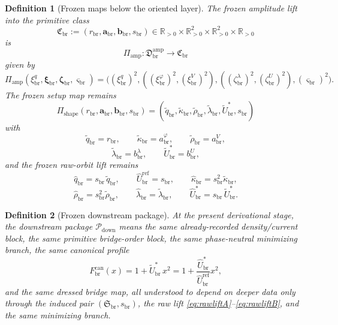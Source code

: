 \documentclass[11pt]{article}
\newcommand{\RespShapeReadout}{\widetilde q_{\mathrm{br}}}
\newcommand{\RespShapeCov}{\widetilde\kappa_{\mathrm{br}}}
\newcommand{\RespShapeRelax}{\widetilde\rho_{\mathrm{br}}}
\newcommand{\RespShapeWell}{\widetilde\lambda_{\mathrm{br}}}
\newcommand{\RespShapeEq}{\widetilde U_{\mathrm{br}}^{\ast}}
\newcommand{\RespRawReadout}{\widehat q_{\mathrm{br}}}
\newcommand{\RespRawRef}{\widehat U_{\mathrm{br}}^{\mathrm{ref}}}
\newcommand{\RespRawCov}{\widehat\kappa_{\mathrm{br}}}
\newcommand{\RespRawRelax}{\widehat\rho_{\mathrm{br}}}
\newcommand{\RespRawWell}{\widehat\lambda_{\mathrm{br}}}
\newcommand{\RespRawEq}{\widehat U_{\mathrm{br}}^{\ast}}
\newcommand{\CurvProfileCan}{F_{\mathrm{br}}^{\mathrm{can}}}
\newcommand{\DownPkg}{\mathscr P_{\mathrm{down}}}
\newcommand{\ShapeTuple}{\mathfrak S_{\mathrm{br}}}
\newcommand{\ScaleMod}{s_{\mathrm{br}}}
\newcommand{\PrimClass}{\mathfrak C_{\mathrm{br}}}
\newcommand{\PrimRead}{r_{\mathrm{br}}}
\newcommand{\PrimCovSlot}{a_{\mathrm{br}}^{\varphi}}
\newcommand{\PrimRelaxSlot}{a_{\mathrm{br}}^{V}}
\newcommand{\PrimKinetic}{\bm a_{\mathrm{br}}}
\newcommand{\PrimWellSlot}{b_{\mathrm{br}}^{\lambda}}
\newcommand{\PrimEqSlot}{b_{\mathrm{br}}^{U}}
\newcommand{\PrimAnchor}{\bm b_{\mathrm{br}}}
\newcommand{\LiftSector}{\mathfrak D_{\mathrm{br}}^{\mathrm{amp}}}
\newcommand{\DeepReadAmp}{\xi_{\mathrm{br}}^{q}}
\newcommand{\DeepCovAmp}{\xi_{\mathrm{br}}^{\varphi}}
\newcommand{\DeepRelaxAmp}{\xi_{\mathrm{br}}^{V}}
\newcommand{\DeepKinAmp}{\bm\xi_{\mathrm{br}}}
\newcommand{\DeepWellAmp}{\zeta_{\mathrm{br}}^{\lambda}}
\newcommand{\DeepEqAmp}{\zeta_{\mathrm{br}}^{U}}
\newcommand{\DeepAnchorAmp}{\bm\zeta_{\mathrm{br}}}
\newcommand{\DeepScaleAmp}{\varsigma_{\mathrm{br}}}
\newcommand{\AmpMap}{\Pi_{\mathrm{amp}}}
\newcommand{\PrimMap}{\Pi_{\mathrm{shape}}}
\newtheorem{definition}{Definition}
\begin{document}
\begin{definition}[Frozen maps below the oriented layer]
\label{def:frozenmaps}
The frozen amplitude lift into the primitive class
\begin{equation}
\PrimClass
:=
(\PrimRead,\PrimKinetic,\PrimAnchor,\ScaleMod)
\in
\mathbb R_{>0}\times\mathbb R_{>0}^{2}\times\mathbb R_{>0}^{2}\times\mathbb R_{>0}
\label{eq:primclass}
\end{equation}
is
\begin{equation}
\AmpMap:\LiftSector\longrightarrow\PrimClass
\label{eq:ampmap}
\end{equation}
given by
\begin{equation}
\AmpMap(\DeepReadAmp,\DeepKinAmp,\DeepAnchorAmp,\DeepScaleAmp)
=
\bigl(
(\DeepReadAmp)^{2},
((\DeepCovAmp)^{2},(\DeepRelaxAmp)^{2}),
((\DeepWellAmp)^{2},(\DeepEqAmp)^{2}),
(\DeepScaleAmp)^{2}
\bigr).
\label{eq:ampmapexplicit}
\end{equation}
The frozen setup map remains
\begin{equation}
\PrimMap(\PrimRead,\PrimKinetic,\PrimAnchor,\ScaleMod)
=
(\RespShapeReadout,\RespShapeCov,\RespShapeRelax,\RespShapeWell,\RespShapeEq,\ScaleMod)
\label{eq:primmap}
\end{equation}
with
\begin{equation}
\RespShapeReadout=\PrimRead,
\qquad
\RespShapeCov=\PrimCovSlot,
\qquad
\RespShapeRelax=\PrimRelaxSlot,
\label{eq:shapeA}
\end{equation}
\begin{equation}
\RespShapeWell=\PrimWellSlot,
\qquad
\RespShapeEq=\PrimEqSlot,
\label{eq:shapeB}
\end{equation}
and the frozen raw-orbit lift remains
\begin{equation}
\RespRawReadout=\ScaleMod\,\RespShapeReadout,
\qquad
\RespRawRef=\ScaleMod,
\qquad
\RespRawCov=\ScaleMod^{2}\RespShapeCov,
\label{eq:rawliftA}
\end{equation}
\begin{equation}
\RespRawRelax=\ScaleMod^{2}\RespShapeRelax,
\qquad
\RespRawWell=\RespShapeWell,
\qquad
\RespRawEq=\ScaleMod\,\RespShapeEq.
\label{eq:rawliftB}
\end{equation}
\end{definition}

\begin{definition}[Frozen downstream package]
\label{def:frozendown}
At the present derivational stage, the downstream package \(\DownPkg\) means the same already-recorded density/current block, the same primitive bridge-order block, the same phase-neutral minimizing branch, the same canonical profile
\begin{equation}
\CurvProfileCan(x)=1+\RespShapeEq\,x^2
=
1+\frac{\RespRawEq}{\RespRawRef}x^2,
\label{eq:profile}
\end{equation}
and the same dressed bridge map, all understood to depend on deeper data only through the induced pair \((\ShapeTuple,\ScaleMod)\), the raw lift \eqref{eq:rawliftA}--\eqref{eq:rawliftB}, and the same minimizing branch.
\end{definition}
\end{document}
